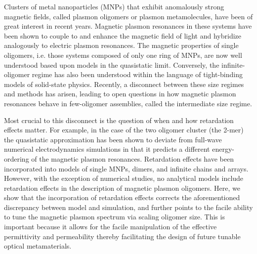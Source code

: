\documentclass[journal=apchd5,manuscript=article]{achemso}
\begin{document}
Clusters of metal nanoparticles (MNPs) that exhibit anomalously strong magnetic fields, called plasmon oligomers or plasmon metamolecules, have been of great interest in recent years\cite{Alu2006,Alu2008,Liu2011,Dionne2011,Qian2015,Dionne2016}. Magnetic plasmon resonances in these systems have been shown to couple to and enhance the magnetic field of light and hybridize analogously to electric plasmon resonances\cite{Zhang2006,Zhang2007,NordHal2011,NordHal2012,Cherqui2014,Cherqui2016,Engheta2017}. The magnetic properties of single oligomers, i.e. those systems composed of only one ring of MNPs, are now well understood based upon models in the quasistatic limit\cite{Nord2006,Dionne2011,Dionne2016,Capolino2017}. Conversely, the infinite-oligomer regime has also been understood within the language of tight-binding models of solid-state physics\cite{Schatz2003,Weick2013}. Recently, a disconnect between these size regimes and methods has arisen, leading to open questions in how magnetic plasmon resonances behave in few-oligomer assemblies, called the intermediate size regime\cite{NordHal2011,NordHal2012,Cherqui2014,Cherqui2016,Engheta2017}.

Most crucial to this disconnect is the question of when and how retardation effects matter. For example, in the case of the two oligomer cluster (the 2-mer) the quasistatic approximation has been shown to deviate from full-wave numerical electrodynamics simulations in that it predicts a different energy-ordering of the magnetic plasmon resonances.\cite{Cherqui2014} Retardation effects have been incorporated into models of single MNPs\cite{Gu2010}, dimers\cite{Oubre2004,vonPlessen2007}, and infinite chains and arrays\cite{Lucas1976,ARAVIND1981,Kottman2001,NordHal2003,NordProdan2004,Rechbacher2003,Schatz2003,Royer2005,Abajo2008,Gomez2009,Chumanov2010,Pinchuk2016}. However, with the exception of numerical studies, no analytical models include retardation effects in the description of magnetic plasmon oligomers. Here, we show that the incorporation of retardation effects corrects the aforementioned discrepancy between model and simulation, and further points to the facile ability to tune the magnetic plasmon spectrum via scaling oligomer size. This is important because it allows for the facile manipulation of the effective permittivity and permeability thereby facilitating the design of future tunable optical metamaterials.
\end{document}

